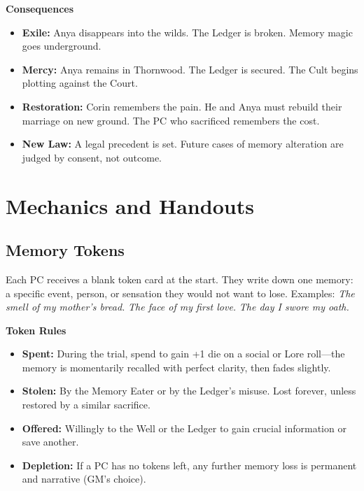\documentclass[12pt]{book}
\begin{document}
\begin{infobox}
\textbf{Consequences}
\begin{itemize}
    \item \textbf{Exile:} Anya disappears into the wilds. The Ledger is broken. Memory magic goes underground.
    \item \textbf{Mercy:} Anya remains in Thornwood. The Ledger is secured. The Cult begins plotting against the Court.
    \item \textbf{Restoration:} Corin remembers the pain. He and Anya must rebuild their marriage on new ground. The PC who sacrificed remembers the cost.
    \item \textbf{New Law:} A legal precedent is set. Future cases of memory alteration are judged by consent, not outcome.
\end{itemize}
\end{infobox}

\chapter{Mechanics and Handouts}

\section{Memory Tokens}

Each PC receives a blank token card at the start. They write down one memory: a specific event, person, or sensation they would not want to lose. Examples: \textit{The smell of my mother's bread.} \textit{The face of my first love.} \textit{The day I swore my oath.}

\begin{infobox}
\textbf{Token Rules}
\begin{itemize}
    \item \textbf{Spent:} During the trial, spend to gain +1 die on a social or Lore roll---the memory is momentarily recalled with perfect clarity, then fades slightly.
    \item \textbf{Stolen:} By the Memory Eater or by the Ledger's misuse. Lost forever, unless restored by a similar sacrifice.
    \item \textbf{Offered:} Willingly to the Well or the Ledger to gain crucial information or save another.
    \item \textbf{Depletion:} If a PC has no tokens left, any further memory loss is permanent and narrative (GM's choice).
\end{itemize}
\end{infobox}
\end{document}
